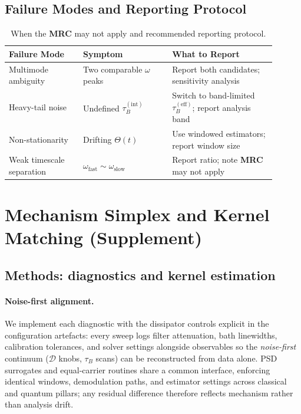 \documentclass[11pt,letterpaper]{article}
\DeclareRobustCommand{\mrc}{\textbf{MRC}\xspace}
\begin{document}
\subsection*{Failure Modes and Reporting Protocol}

\begin{table}[h!]
\centering
\caption{When the \mrc may not apply and recommended reporting protocol.}
\label{tab:failures}
\begin{tabular}{@{}p{0.25\linewidth}p{0.30\linewidth}p{0.35\linewidth}@{}}
\toprule
Failure Mode & Symptom & What to Report \\
\midrule
Multimode ambiguity & Two comparable $\omega$ peaks & Report both candidates; sensitivity analysis \\
Heavy-tail noise & Undefined $\tau_B^{(\mathrm{int})}$ & Switch to band-limited $\tau_B^{(\mathrm{eff})}$; report analysis band \\
Non-stationarity & Drifting $\Theta(t)$ & Use windowed estimators; report window size \\
Weak timescale separation & $\omega_{\mathrm{fast}}\sim\omega_{\mathrm{slow}}$ & Report ratio; note \mrc may not apply \\
\bottomrule
\end{tabular}
\end{table}

\FloatBarrier
\section*{Mechanism Simplex and Kernel Matching (Supplement)}
\subsection*{Methods: diagnostics and kernel estimation}
\paragraph*{Noise-first alignment.} We implement each diagnostic with the dissipator controls explicit in the configuration artefacts: every sweep logs filter attenuation, bath linewidths, calibration tolerances, and solver settings alongside observables so the \emph{noise-first} continuum ($\mathcal{D}$ knobs, $\tau_B$ scans) can be reconstructed from data alone. PSD surrogates and equal-carrier routines share a common interface, enforcing identical windows, demodulation paths, and estimator settings across classical and quantum pillars; any residual difference therefore reflects mechanism rather than analysis drift.
\end{document}
